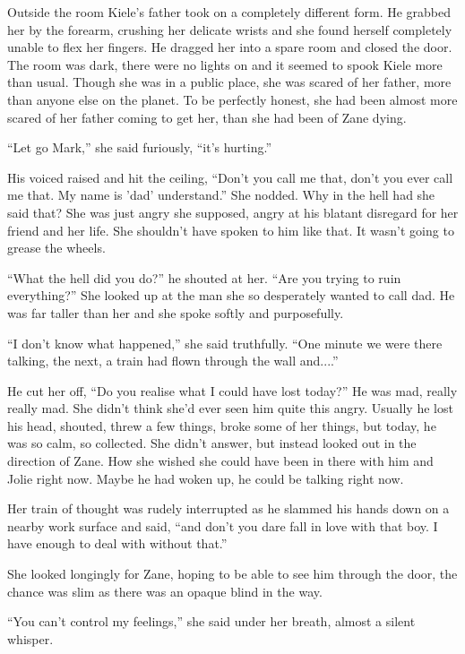 \thoughtbreak



Outside the room Kiele's father took on a completely different form.  He grabbed her by the forearm, crushing her delicate wrists and she found herself completely unable to flex her fingers.  He dragged her into a spare room and closed the door.  The room was dark, there were no lights on and it seemed to spook Kiele more than usual.  Though she was in a public place, she was scared of her father, more than anyone else on the planet.  To be perfectly honest, she had been almost more scared of her father coming to get her, than she had been of Zane dying.  

``Let go Mark,'' she said furiously, ``it's hurting.''

His voiced raised and hit the ceiling, ``Don't you call me that, don't you ever call me that.  My name is 'dad' understand.''  She nodded.  Why in the hell had she said that?  She was just angry she supposed, angry at his blatant disregard for her friend and her life.  She shouldn't have spoken to him like that.  It wasn't going to grease the wheels.

``What the hell did you do?'' he shouted at her.  ``Are you trying to ruin everything?''  She looked up at the man she so desperately wanted to call dad.  He was far taller than her and she spoke softly and purposefully.

``I don't know what happened,'' she said truthfully.  ``One minute we were there talking, the next, a train had flown through the wall and....''

He cut her off, ``Do you realise what I could have lost today?''  He was mad, really really mad.  She didn't think she'd ever seen him quite this angry.  Usually he lost his head, shouted, threw a few things, broke some of her things, but today, he was so calm, so collected.  She didn't answer, but instead looked out in the direction of Zane.  How she wished she could have been in there with him and Jolie right now.  Maybe he had woken up, he could be talking right now.  

Her train of thought was rudely interrupted as he slammed his hands down on a nearby work surface and said, ``and don't you dare fall in love with that boy.  I have enough to deal with without that.''

She looked longingly for Zane, hoping to be able to see him through the door, the chance was slim as there was an opaque blind in the way.  

``You can't control my feelings,'' she said under her breath, almost a silent whisper.

